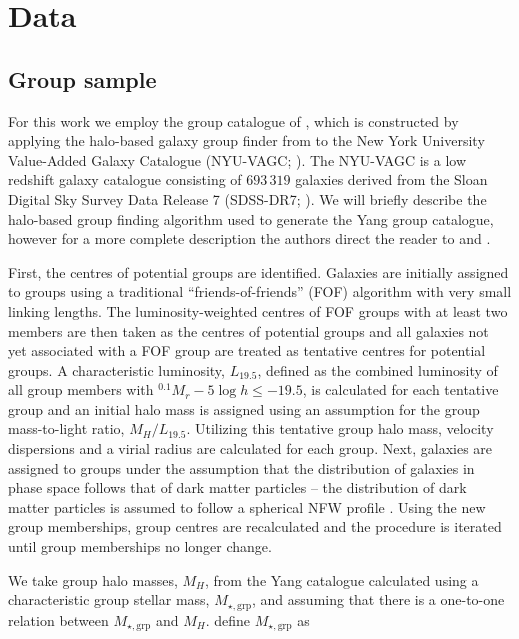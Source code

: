 \documentclass[a4paper,fleqn,usenatbib]{mnras}
\begin{document}

\section{Data}
\label{sec:data}

\subsection{Group sample}
\label{sec:data_group}

For this work we employ the group catalogue of \citet{yang2007}, which
is constructed by applying the halo-based galaxy group finder from
\citet{yang2005, yang2007} to the New York University Value-Added
Galaxy Catalogue (NYU-VAGC; \citealt{blanton2005}).  The NYU-VAGC is a
low redshift galaxy catalogue consisting of
$693\,319$ galaxies derived from the Sloan Digital Sky Survey Data Release
7 (SDSS-DR7; \citealt{abazajian2009}).  We will briefly describe the
halo-based group finding algorithm used to generate the Yang group catalogue,
however for a more complete description the authors direct the reader
to \citet{yang2005} and \citet{yang2007}.
\par
First, the centres of potential groups are identified.  Galaxies are
initially assigned to groups using a traditional
``friends-of-friends'' (FOF) algorithm \citep[e.g.][]{huchra1982} with
very small linking lengths.  The luminosity-weighted centres of
FOF groups with at least two members are then taken as the centres of
potential groups and all galaxies not yet associated with a FOF group
are treated as tentative centres for potential groups.  A
characteristic luminosity, $L_{19.5}$, defined as the combined
luminosity of all group members with $^{0.1}M_r - 5\log h \le -19.5$,
is calculated for each tentative group and an initial halo mass is
assigned using an assumption for the group mass-to-light ratio,
$M_H/L_{19.5}$.  Utilizing this tentative group halo mass, velocity
dispersions and a virial radius are calculated for each group.  Next,
galaxies are assigned to groups under the assumption that the
distribution of galaxies in phase space follows that of dark matter
particles -- the distribution of dark matter particles is assumed to
follow a spherical NFW profile \citep{navarro1997}.  Using the new
group memberships, group centres are recalculated and the procedure is
iterated until group memberships no longer change.
\par
We take group halo masses, $M_H$, from the Yang catalogue calculated
using a characteristic group stellar mass, $M_{\star,\text{grp}}$, and
assuming that there is a one-to-one relation between $M_{\star,\text{grp}}$
and $M_H$.  \citet{yang2007} define $M_{\star,\text{grp}}$ as
\end{document}
